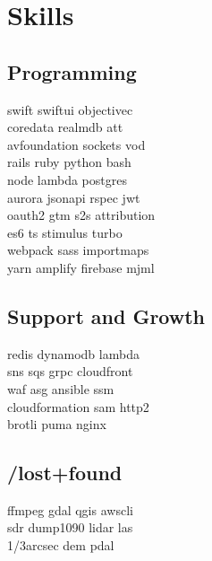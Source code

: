 \documentclass[]{plushcv}
\begin{document}
\begin{minipage}[t]{0.25\textwidth} 


\section{Skills}
\subsection{Programming}
\sectionsep
{}
swift \textbullet{} swiftui \textbullet{} objectivec  \\ 
coredata \textbullet{} realmdb \textbullet{} att \\
avfoundation \textbullet{} sockets \textbullet{} vod \\
\sectionsep
{}
rails \textbullet{} ruby \textbullet{} python \textbullet{} bash \\
node \textbullet{} lambda \textbullet{} postgres   \\
aurora \textbullet{} jsonapi \textbullet{} rspec \textbullet{} jwt \\
oauth2 \textbullet{} gtm \textbullet{} s2s attribution \\
\sectionsep
{}
es6 \textbullet{} ts \textbullet{} stimulus \textbullet{} turbo \\
webpack \textbullet{} sass \textbullet{} importmaps \\
yarn \textbullet{} amplify \textbullet{} firebase \textbullet{} mjml \\
\sectionsep
\sectionsep
\subsection{Support and Growth}
\sectionsep
redis \textbullet{} dynamodb \textbullet{} lambda \\
sns \textbullet{} sqs \textbullet{} grpc \textbullet{} cloudfront \\
waf \textbullet{} asg \textbullet{} ansible \textbullet{} ssm \\
cloudformation \textbullet{} sam \textbullet{} http2 \\
brotli \textbullet{} puma \textbullet{} nginx \\


\sectionsep
\sectionsep
\subsection{/lost+found}
\sectionsep
ffmpeg \textbullet{} gdal \textbullet{} qgis \textbullet{} awscli  \\
sdr \textbullet{} dump1090 \textbullet{} lidar las \\
1/3arcsec dem \textbullet{} pdal \\





\end{minipage}
\end{document}
